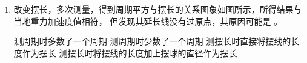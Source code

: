 \begin{enumerate}
\begin{enumerate}
\item 
改变摆长，多次测量，得到周期平方与摆长的关系图象如图所示，所得结果与当地重力加速度值相符，
但发现其延长线没有过原点，其原因可能是 \underlinegap 。
\begin{figure}[h!]
\centering

\end{figure}

\fourchoices
{测周期时多数了一个周期}
{测周期时少数了一个周期}
{测摆长时直接将摆线的长度作为摆长}
{测摆长时将摆线的长度加上摆球的直径作为摆长}


\end{enumerate}





\end{enumerate}
